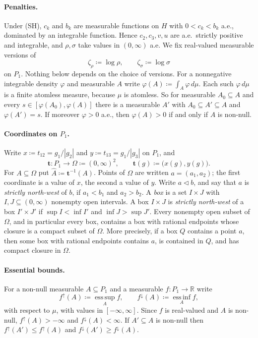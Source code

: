 \documentclass[11pt]{article}
\theoremstyle{definition}\newtheorem{definition}[theorem]{Definition}
\theoremstyle{remark}\newtheorem{remark}[theorem]{Remark}
\begin{document}
\paragraph{Penalties.} Under (SH), $c_k$ and $b_k$ are measurable functions on
$H$ with $0<c_k<b_k$ a.e., dominated by an integrable function. Hence
$c_2,c_3,v,u$ are a.e.\ strictly positive and integrable, and $\rho,\sigma$
take values in $(0,\infty)$ a.e. We fix real-valued measurable versions of
\[
 \zeta_\rho\coloneqq\log\rho,\qquad \zeta_\sigma\coloneqq\log\sigma
\]
on $P_1$. Nothing below depends on the choice of versions. For a
nonnegative integrable density $\varphi$ and measurable $A$ write
$\varphi(A)\coloneqq\int_A\varphi\,d\mu$. Each such $\varphi\,d\mu$ is a finite atomless
measure, because $\mu$ is atomless. So for measurable $A_0\subseteq A$ and
every $s\in[\varphi(A_0),\varphi(A)]$ there is a measurable $A'$ with
$A_0\subseteq A'\subseteq A$ and $\varphi(A')=s$. If moreover $\varphi>0$ a.e., then
$\varphi(A)>0$ if and only if $A$ is non-null.

\paragraph{Coordinates on $P_1$.} Write $x\coloneqq t_{12}=g_1/|g_2|$ and
$y\coloneqq t_{13}=g_1/|g_3|$ on $P_1$, and
\[
 \mathbf t\colon P_1\to\Omega\coloneqq(0,\infty)^2,\qquad
 \mathbf t(g)\coloneqq\bigl(x(g),y(g)\bigr).
\]
For $A\subseteq\Omega$ put $\widehat A\coloneqq\mathbf t^{-1}(A)$. Points of
$\Omega$ are written $a=(a_1,a_2)$; the first coordinate is a value of $x$,
the second a value of $y$. Write $a\lhd b$, and say that $a$ is
\emph{strictly north-west} of $b$, if $a_1<b_1$ and $a_2>b_2$. A \emph{box}
is a set $I\times J$ with $I,J\subseteq(0,\infty)$ nonempty open intervals.
A box $I\times J$ is \emph{strictly north-west} of a box $I'\times J'$ if
$\sup I<\inf I'$ and $\inf J>\sup J'$. Every nonempty open subset of
$\Omega$, and in particular every box, contains a box with rational endpoints
whose closure is a compact subset of $\Omega$. More precisely, if a box $Q$
contains a point $a$, then some box with rational endpoints contains $a$, is
contained in $Q$, and has compact closure in $\Omega$.

\paragraph{Essential bounds.} For a non-null measurable $A\subseteq P_1$ and
a measurable $f\colon P_1\to\mathbb R$ write
\[
 f^{\uparrow}(A)\coloneqq\operatorname*{ess\,sup}_Af,\qquad
 f^{\downarrow}(A)\coloneqq\operatorname*{ess\,inf}_Af,
\]
with respect to $\mu$, with values in $[-\infty,\infty]$. Since $f$ is
real-valued and $A$ is non-null, $f^{\uparrow}(A)>-\infty$ and
$f^{\downarrow}(A)<\infty$. If $A'\subseteq A$ is non-null then
$f^{\uparrow}(A')\le f^{\uparrow}(A)$ and $f^{\downarrow}(A')\ge
f^{\downarrow}(A)$.
\end{document}
